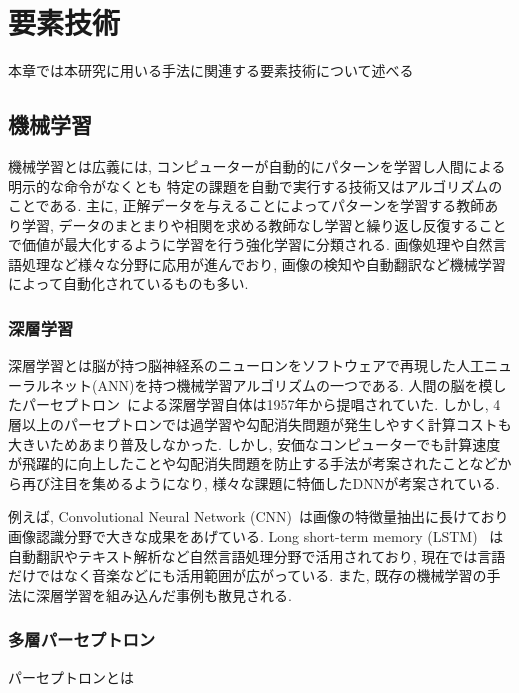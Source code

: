 \chapter{要素技術}
\label{technical_background}

本章では本研究に用いる手法に関連する要素技術について述べる


\section{機械学習}

機械学習とは広義には, コンピューターが自動的にパターンを学習し人間による明示的な命令がなくとも
特定の課題を自動で実行する技術又はアルゴリズムのことである. 主に, 正解データを与えることによってパターンを学習する教師あり学習,
データのまとまりや相関を求める教師なし学習と繰り返し反復することで価値が最大化するように学習を行う強化学習に分類される.
画像処理や自然言語処理など様々な分野に応用が進んでおり, 画像の検知や自動翻訳など機械学習によって自動化されているものも多い.


\subsection{深層学習}

深層学習とは脳が持つ脳神経系のニューロンをソフトウェアで再現した人工ニューラルネット(ANN)を持つ機械学習アルゴリズムの一つである. 
人間の脳を模したパーセプトロン~\cite{Perceptron}による深層学習自体は1957年から提唱されていた. しかし, 4層以上のパーセプトロンでは過学習や勾配消失問題が発生しやすく計算コストも大きいためあまり普及しなかった.
しかし, 安価なコンピューターでも計算速度が飛躍的に向上したことや勾配消失問題を防止する手法が考案されたことなどから再び注目を集めるようになり, 様々な課題に特価したDNNが考案されている.

例えば, Convolutional Neural Network (CNN)~\cite{CNN}は画像の特徴量抽出に長けており画像認識分野で大きな成果をあげている.
Long short-term memory (LSTM) ~\cite{LSTM}は自動翻訳やテキスト解析など自然言語処理分野で活用されており, 現在では言語だけではなく音楽などにも活用範囲が広がっている.
また, 既存の機械学習の手法に深層学習を組み込んだ事例も散見される.

\subsection{多層パーセプトロン}
パーセプトロンとは


